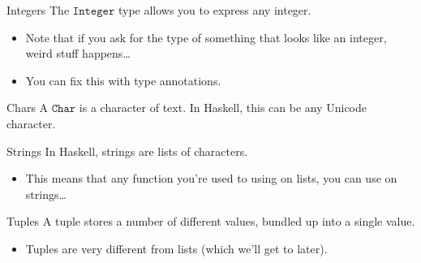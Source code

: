\documentclass[presentation]{beamer}
\begin{document}
\begin{frame}[label={sec:org6e15a64}]{Integers}
The \(\mathtt{Integer}\) type allows you to express any integer.
\pause
\begin{itemize}[<+->]
\item Note that if you ask for the type of something that looks like an integer,
weird stuff happens\ldots
\item You can fix this with type annotations.
\end{itemize}
\end{frame}

\begin{frame}[label={sec:org1b3c6ee}]{Chars}
A \(\mathtt{Char}\) is a character of text. In Haskell, this can be any Unicode
character.
\end{frame}

\begin{frame}[label={sec:orgb1e760c}]{Strings}
In Haskell, strings are lists of characters.
\pause
\begin{itemize}[<+->]
\item This means that any function you're used to using on lists, you can use on
strings\ldots
\end{itemize}
\end{frame}

\begin{frame}[label={sec:orgfa4dc7c}]{Tuples}
A tuple stores a number of different values, bundled up into a single value.
\pause
\begin{itemize}[<+->]
\item Tuples are very different from lists (which we'll get to later).
\end{itemize}
\end{frame}
\end{document}
